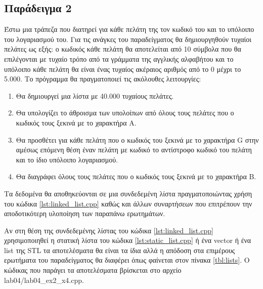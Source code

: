




\subsection{Παράδειγμα 2}
Έστω μια τράπεζα που διατηρεί για κάθε πελάτη της τον κωδικό του και το υπόλοιπο του λογαριασμού του. Για τις ανάγκες του παραδείγματος θα δημιουργηθούν τυχαίοι πελάτες ως εξής: ο κωδικός κάθε πελάτη θα αποτελείται από 10 σύμβολα που θα επιλέγονται με τυχαίο τρόπο από τα γράμματα της αγγλικής αλφαβήτου και το υπόλοιπο κάθε πελάτη θα είναι ένας τυχαίος ακέραιος αριθμός από το 0 μέχρι το 5.000. Το πρόγραμμα θα πραγματοποιεί τις ακόλουθες λειτουργίες: 
\begin{enumerate}[noitemsep,label=\Alph*]
\item Θα δημιουργεί μια λίστα με 40.000 τυχαίους πελάτες.
\item Θα υπολογίζει το άθροισμα των υπολοίπων από όλους τους πελάτες που ο κωδικός τους ξεκινά με το χαρακτήρα Α.
\item Θα προσθέτει για κάθε πελάτη που ο κωδικός του ξεκινά με το χαρακτήρα G στην αμέσως επόμενη θέση έναν πελάτη με κωδικό το αντίστροφο κωδικό του πελάτη και το ίδιο υπόλοιπο λογαριασμού.
\item Θα διαγράφει όλους τους πελάτες που ο κωδικός τους ξεκινά με το χαρακτήρα Β.
\end{enumerate}
Τα δεδομένα θα αποθηκεύονται σε μια συνδεδεμένη λίστα πραγματοποιώντας χρήση του κώδικα \ref{lst:linked_list.cpp} καθώς και άλλων συναρτήσεων που επιτρέπουν την αποδοτικότερη υλοποίηση των παραπάνω ερωτημάτων.





Αν στη θέση της συνδεδεμένης λίστας του κώδικα \ref{lst:linked_list.cpp} χρησιμοποιηθεί η στατική λίστα του κώδικα \ref{lst:static_list.cpp} ή ένα vector ή ένα list της STL τα αποτελέσματα θα είναι τα ίδια αλλά η απόδοση στα επιμέρους ερωτήματα του παραδείγματος θα διαφέρει όπως φαίνεται στον πίνακα \ref{tbl:lists}. Ο κώδικας που παράγει τα αποτελέσματα βρίσκεται στο αρχείο lab04/lab04\_ex2\_x4.cpp.

